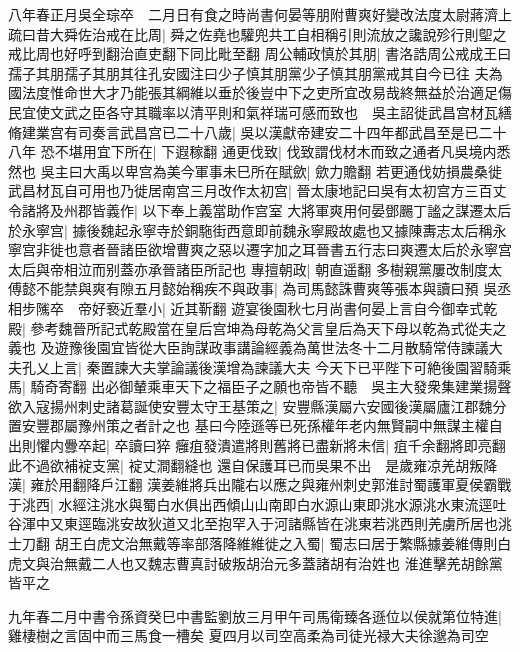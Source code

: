 八年春正月吳全琮卒　二月日有食之時尚書何晏等朋附曹爽好變改法度太尉蔣濟上疏曰昔大舜佐治戒在比周|{
	舜之佐堯也驩兜共工自相稱引則流放之讒說殄行則堲之戒比周也好呼到翻治直吏翻下同比毗至翻}
周公輔政慎於其朋|{
	書洛誥周公戒成王曰孺子其朋孺子其朋其往孔安國注曰少子慎其朋黨少子慎其朋黨戒其自今已往}
夫為國法度惟命世大才乃能張其綱維以垂於後豈中下之吏所宜改易哉終無益於治適足傷民宜使文武之臣各守其職率以清平則和氣祥瑞可感而致也　吳主詔徙武昌宫材瓦繕脩建業宫有司奏言武昌宫已二十八歲|{
	吳以漢獻帝建安二十四年都武昌至是已二十八年}
恐不堪用宜下所在|{
	下遐稼翻}
通更伐致|{
	伐致謂伐材木而致之通者凡吳境内悉然也}
吳主曰大禹以卑宫為美今軍事未巳所在賦歛|{
	歛力贍翻}
若更通伐妨損農桑徙武昌材瓦自可用也乃徙居南宫三月改作太初宫|{
	晉太康地記曰吳有太初宫方三百丈}
令諸將及州郡皆義作|{
	以下奉上義當助作宫室}
大將軍爽用何晏鄧颺丁謐之謀遷太后於永寧宫|{
	據後魏起永寧寺於銅駞街西意即前魏永寧殿故處也又據陳夀志太后稱永寧宫非徙也意者晉諸臣欲增曹爽之惡以遷字加之耳晉書五行志曰爽遷太后於永寧宫太后與帝相泣而别蓋亦承晉諸臣所記也}
專擅朝政|{
	朝直遥翻}
多樹親黨屢改制度太傅懿不能禁與爽有隙五月懿始稱疾不與政事|{
	為司馬懿誅曹爽等張本與讀曰預}
吳丞相步隲卒　帝好䙝近羣小|{
	近其靳翻}
遊宴後園秋七月尚書何晏上言自今御幸式乾殿|{
	參考魏晉所記式乾殿當在皇后宫坤為母乾為父言皇后為天下母以乾為式從夫之義也}
及遊豫後園宜皆從大臣詢謀政事講論經義為萬世法冬十二月散騎常侍諫議大夫孔乂上言|{
	秦置諫大夫掌論議後漢增為諫議大夫}
今天下已平陛下可絶後園習騎乘馬|{
	騎奇寄翻}
出必御輦乘車天下之福臣子之願也帝皆不聽　吳主大發衆集建業揚聲欲入寇揚州刺史諸葛誕使安豐太守王基策之|{
	安豐縣漢屬六安國後漢屬廬江郡魏分置安豐郡屬豫州策之者計之也}
基曰今陸遜等已死孫權年老内無賢嗣中無謀主權自出則懼内釁卒起|{
	卒讀曰猝}
癰疽發潰遣將則舊將已盡新將未信|{
	疽千余翻將即亮翻}
此不過欲補䘺支黨|{
	䘺丈澗翻縫也}
還自保護耳已而吳果不出　是歲雍凉羌胡叛降漢|{
	雍於用翻降戶江翻}
漢姜維將兵出隴右以應之與雍州刺史郭淮討蜀護軍夏侯霸戰于洮西|{
	水經注洮水與蜀白水俱出西傾山山南即白水源山東即洮水源洮水東流逕吐谷渾中又東逕臨洮安故狄道又北至抱罕入于河諸縣皆在洮東若洮西則羌虜所居也洮士刀翻}
胡王白虎文治無戴等率部落降維維徙之入蜀|{
	蜀志曰居于繁縣據姜維傳則白虎文與治無戴二人也又魏志曹真討破叛胡治元多蓋諸胡有治姓也}
淮進擊羌胡餘黨皆平之

九年春二月中書令孫資癸巳中書監劉放三月甲午司馬衛臻各遜位以侯就第位特進|{
	雞棲樹之言固中而三馬食一槽矣}
夏四月以司空高柔為司徒光禄大夫徐邈為司空

